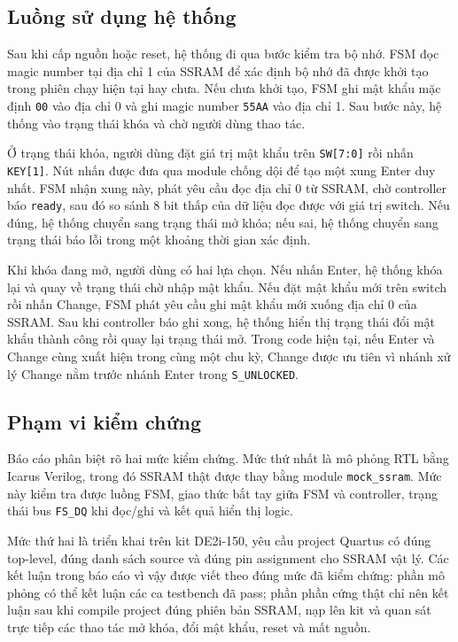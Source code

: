 \documentclass[13pt,a4paper]{article}
\begin{document}
\subsection{Luồng sử dụng hệ thống}
Sau khi cấp nguồn hoặc reset, hệ thống đi qua bước kiểm tra bộ nhớ. FSM đọc magic number tại địa chỉ 1 của SSRAM để xác định bộ nhớ đã được khởi tạo trong phiên chạy hiện tại hay chưa. Nếu chưa khởi tạo, FSM ghi mật khẩu mặc định \texttt{00} vào địa chỉ 0 và ghi magic number \texttt{55AA} vào địa chỉ 1. Sau bước này, hệ thống vào trạng thái khóa và chờ người dùng thao tác.

Ở trạng thái khóa, người dùng đặt giá trị mật khẩu trên \texttt{SW[7:0]} rồi nhấn \texttt{KEY[1]}. Nút nhấn được đưa qua module chống dội để tạo một xung Enter duy nhất. FSM nhận xung này, phát yêu cầu đọc địa chỉ 0 từ SSRAM, chờ controller báo \texttt{ready}, sau đó so sánh 8 bit thấp của dữ liệu đọc được với giá trị switch. Nếu đúng, hệ thống chuyển sang trạng thái mở khóa; nếu sai, hệ thống chuyển sang trạng thái báo lỗi trong một khoảng thời gian xác định.

Khi khóa đang mở, người dùng có hai lựa chọn. Nếu nhấn Enter, hệ thống khóa lại và quay về trạng thái chờ nhập mật khẩu. Nếu đặt mật khẩu mới trên switch rồi nhấn Change, FSM phát yêu cầu ghi mật khẩu mới xuống địa chỉ 0 của SSRAM. Sau khi controller báo ghi xong, hệ thống hiển thị trạng thái đổi mật khẩu thành công rồi quay lại trạng thái mở. Trong code hiện tại, nếu Enter và Change cùng xuất hiện trong cùng một chu kỳ, Change được ưu tiên vì nhánh xử lý Change nằm trước nhánh Enter trong \texttt{S\_UNLOCKED}.

\subsection{Phạm vi kiểm chứng}
Báo cáo phân biệt rõ hai mức kiểm chứng. Mức thứ nhất là mô phỏng RTL bằng Icarus Verilog, trong đó SSRAM thật được thay bằng module \texttt{mock\_ssram}. Mức này kiểm tra được luồng FSM, giao thức bắt tay giữa FSM và controller, trạng thái bus \texttt{FS\_DQ} khi đọc/ghi và kết quả hiển thị logic.

Mức thứ hai là triển khai trên kit DE2i-150, yêu cầu project Quartus có đúng top-level, đúng danh sách source và đúng pin assignment cho SSRAM vật lý. Các kết luận trong báo cáo vì vậy được viết theo đúng mức đã kiểm chứng: phần mô phỏng có thể kết luận các ca testbench đã pass; phần phần cứng thật chỉ nên kết luận sau khi compile project đúng phiên bản SSRAM, nạp lên kit và quan sát trực tiếp các thao tác mở khóa, đổi mật khẩu, reset và mất nguồn.
\end{document}
